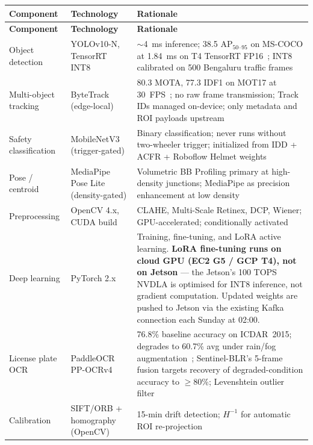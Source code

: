 \documentclass[11pt,a4paper]{article}
\begin{document}
\begin{longtable}{L{3.5cm} L{4.5cm} L{6.5cm}}
    \toprule
    \color{white}\textbf{Component} & \color{white}\textbf{Technology} & \color{white}\textbf{Rationale} \\
    \midrule
    \endfirsthead
    \toprule
    \color{white}\textbf{Component} & \color{white}\textbf{Technology} & \color{white}\textbf{Rationale} \\
    \midrule
    \endhead
    \bottomrule
    \endfoot

    Object detection & YOLOv10-N, TensorRT INT8 & $\sim$4~ms inference; 38.5 AP$_{50\text{--}95}$ on MS-COCO at 1.84~ms on T4 TensorRT FP16~\cite{wang2024yolov10}; INT8 calibrated on 500 Bengaluru traffic frames \\
    Multi-object tracking & ByteTrack (edge-local) & 80.3 MOTA, 77.3 IDF1 on MOT17 at 30~FPS~\cite{zhang2022bytetrack}; no raw frame transmission; Track IDs managed on-device; only metadata and ROI payloads upstream \\
    Safety classification & MobileNetV3 (trigger-gated) & Binary classification; never runs without two-wheeler trigger; initialized from IDD + ACFR + Roboflow Helmet weights \\
    Pose / centroid & MediaPipe Pose Lite (density-gated) & Volumetric BB Profiling primary at high-density junctions; MediaPipe as precision enhancement at low density \\
    Preprocessing & OpenCV 4.x, CUDA build & CLAHE, Multi-Scale Retinex, DCP, Wiener; GPU-accelerated; conditionally activated \\
    Deep learning & PyTorch 2.x & Training, fine-tuning, and LoRA active learning. \textbf{LoRA fine-tuning runs on cloud GPU (EC2 G5 / GCP T4), not on Jetson} --- the Jetson's 100 TOPS NVDLA is optimised for INT8 inference, not gradient computation. Updated weights are pushed to Jetson via the existing Kafka connection each Sunday at 02:00. \\
    License plate OCR & PaddleOCR PP-OCRv4 & 76.8\% baseline accuracy on ICDAR~2015; degrades to 60.7\% avg under rain/fog augmentation~\cite{paddleocr2023}; Sentinel-BLR's 5-frame fusion targets recovery of degraded-condition accuracy to $\geq$80\%; Levenshtein outlier filter \\
    Calibration & SIFT/ORB + homography (OpenCV) & 15-min drift detection; $H^{-1}$ for automatic ROI re-projection \\

\end{longtable}
\end{document}
